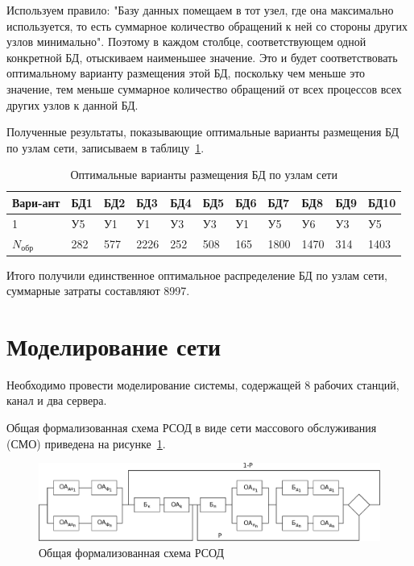 \documentclass[russian,utf8,emptystyle]{eskdtext}
\begin{document}
Используем правило: "Базу данных помещаем в тот узел, где она максимально используется, то есть суммарное количество обращений к ней со стороны других узлов минимально". Поэтому в каждом столбце, соответствующем одной конкретной БД, отыскиваем наименьшее значение. Это и будет соответствовать оптимальному варианту размещения этой БД, поскольку чем меньше это значение, тем меньше суммарное количество обращений от всех процессов всех других узлов к данной БД.

Полученные результаты, показывающие оптимальные варианты размещения БД по узлам сети, записываем в таблицу~\ref{tab:bd-5}.

\begin{longtable}{p{1.1cm}|p{1cm}|p{1cm}|p{1cm}|p{1cm}|p{1cm}|p{1cm}|p{1cm}|p{1cm}|p{1cm}|p{1cm}}
\caption{Оптимальные варианты размещения БД по узлам сети}
\label{tab:bd-5} \\
Вари-ант&  БД1 &  БД2 &  БД3 &  БД4 &  БД5 &  БД6 &  БД7 &  БД8 &  БД9 &  БД10 \\
\hline
1       & У5   & У1   & У1   & У3   & У3   & У1   & У5   & У6   & У3   & У5    \\
\hline\hline
$N_\text{обр}$    
       & 282   & 577  & 2226 & 252  & 508  & 165  & 1800 & 1470 & 314  & 1403  \\
\end{longtable}

Итого получили единственное оптимальное распределение БД по узлам сети, суммарные затраты составляют 8997.

\clearpage
\section{Моделирование сети}
Необходимо провести моделирование системы, содержащей 8 рабочих станций, канал и два сервера. 

Общая формализованная схема РСОД в виде сети массового обслуживания (СМО) приведена на рисунке~\ref{fig:anal-1}.

\begin{figure}[h!]
\centering
\includegraphics[width=1.0\textwidth]{anal1}
\caption{Общая формализованная схема РСОД}
\label{fig:anal-1}
\end{figure}
\end{document}
